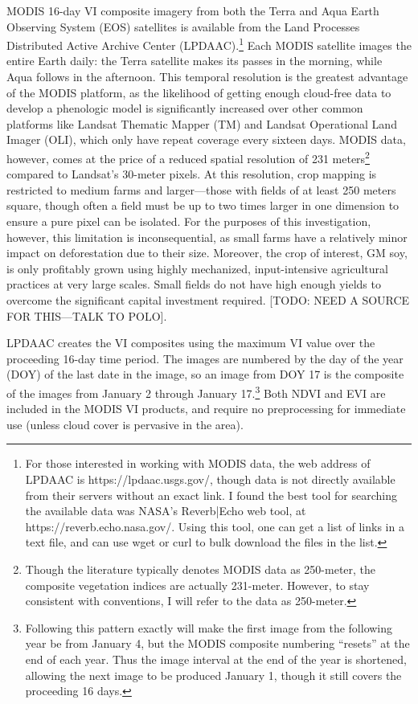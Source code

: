 MODIS 16-day VI composite imagery from both the Terra and Aqua Earth Observing System (EOS) satellites is available from the Land Processes Distributed Active Archive Center (LPDAAC).\footnote{For those interested in working with MODIS data, the web address of LPDAAC is https://lpdaac.usgs.gov/, though data is not directly available from their servers without an exact link. I found the best tool for searching the available data was NASA’s Reverb|Echo web tool, at https://reverb.echo.nasa.gov/. Using this tool, one can get a list of links in a text file, and can use wget or curl to bulk download the files in the list.} Each MODIS satellite images the entire Earth daily: the Terra satellite makes its passes in the morning, while Aqua follows in the afternoon. This temporal resolution is the greatest advantage of the MODIS platform, as the likelihood of getting enough cloud-free data to develop a phenologic model is significantly increased over other common platforms like Landsat Thematic Mapper (TM) and Landsat Operational Land Imager (OLI), which only have repeat coverage every sixteen days. MODIS data, however, comes at the price of a reduced spatial resolution of 231 meters\footnote{Though the literature typically denotes MODIS data as 250-meter, the composite vegetation indices are actually 231-meter. However, to stay consistent with conventions, I will refer to the data as 250-meter.} compared to Landsat’s 30-meter pixels. At this resolution, crop mapping is restricted to medium farms and larger---those with fields of at least 250 meters square, though often a field must be up to two times larger in one dimension to ensure a pure pixel can be isolated. For the purposes of this investigation, however, this limitation is inconsequential, as small farms have a relatively minor impact on deforestation due to their size. Moreover, the crop of interest, GM soy, is only profitably grown using highly mechanized, input-intensive agricultural practices at very large scales. Small fields do not have high enough yields to overcome the significant capital investment required. [TODO: NEED A SOURCE FOR THIS---TALK TO POLO].

LPDAAC creates the VI composites using the maximum VI value over the proceeding 16-day time period. The images are numbered by the day of the year (DOY) of the last date in the image, so an image from DOY 17 is the composite of the images from January 2 through January 17.\footnote{Following this pattern exactly will make the first image from the following year be from January 4, but the MODIS composite numbering ``resets'' at the end of each year. Thus the image interval at the end of the year is shortened, allowing the next image to be produced January 1, though it still covers the proceeding 16 days.} Both NDVI and EVI are included in the MODIS VI products, and require no preprocessing for immediate use (unless cloud cover is pervasive in the area).

